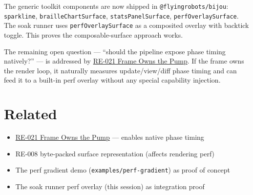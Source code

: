 The generic toolkit components are now shipped in \texttt{@\allowbreak{}f\allowbreak{}l\allowbreak{}y\allowbreak{}i\allowbreak{}n\allowbreak{}g\allowbreak{}r\allowbreak{}o\allowbreak{}b\allowbreak{}o\allowbreak{}t\allowbreak{}s\allowbreak{}/\allowbreak{}b\allowbreak{}i\allowbreak{}j\allowbreak{}o\allowbreak{}u}: \texttt{s\allowbreak{}p\allowbreak{}a\allowbreak{}r\allowbreak{}k\allowbreak{}l\allowbreak{}i\allowbreak{}n\allowbreak{}e}, \texttt{b\allowbreak{}r\allowbreak{}a\allowbreak{}i\allowbreak{}l\allowbreak{}l\allowbreak{}e\allowbreak{}C\allowbreak{}h\allowbreak{}a\allowbreak{}r\allowbreak{}t\allowbreak{}S\allowbreak{}u\allowbreak{}r\allowbreak{}f\allowbreak{}a\allowbreak{}c\allowbreak{}e}, \texttt{s\allowbreak{}t\allowbreak{}a\allowbreak{}t\allowbreak{}s\allowbreak{}P\allowbreak{}a\allowbreak{}n\allowbreak{}e\allowbreak{}l\allowbreak{}S\allowbreak{}u\allowbreak{}r\allowbreak{}f\allowbreak{}a\allowbreak{}c\allowbreak{}e}, \texttt{p\allowbreak{}e\allowbreak{}r\allowbreak{}f\allowbreak{}O\allowbreak{}v\allowbreak{}e\allowbreak{}r\allowbreak{}l\allowbreak{}a\allowbreak{}y\allowbreak{}S\allowbreak{}u\allowbreak{}r\allowbreak{}f\allowbreak{}a\allowbreak{}c\allowbreak{}e}. The soak runner uses \texttt{p\allowbreak{}e\allowbreak{}r\allowbreak{}f\allowbreak{}O\allowbreak{}v\allowbreak{}e\allowbreak{}r\allowbreak{}l\allowbreak{}a\allowbreak{}y\allowbreak{}S\allowbreak{}u\allowbreak{}r\allowbreak{}f\allowbreak{}a\allowbreak{}c\allowbreak{}e} as a composited overlay with backtick toggle. This proves the composable-surface approach works.

The remaining open question --- ``should the pipeline expose phase timing natively?'' --- is addressed by \href{https://github.com/flyingrobots/bijou/blob/cbd70612140e7a450d764b3c7be1c6af878b99bc/docs/method/retro/RE-021-frame-owns-the-pump.md}{RE-021 Frame Owns the Pump}. If the frame owns the render loop, it naturally measures update/view/diff phase timing and can feed it to a built-in perf overlay without any special capability injection.

\section{Related}\label{record-338-related}

\begin{itemize}
\tightlist
\item
  \href{https://github.com/flyingrobots/bijou/blob/cbd70612140e7a450d764b3c7be1c6af878b99bc/docs/method/retro/RE-021-frame-owns-the-pump.md}{RE-021 Frame Owns the Pump} --- enables native phase timing
\item
  RE-008 byte-packed surface representation (affects rendering perf)
\item
  The perf gradient demo (\texttt{e\allowbreak{}x\allowbreak{}a\allowbreak{}m\allowbreak{}p\allowbreak{}l\allowbreak{}e\allowbreak{}s\allowbreak{}/\allowbreak{}p\allowbreak{}e\allowbreak{}r\allowbreak{}f\allowbreak{}-\allowbreak{}g\allowbreak{}r\allowbreak{}a\allowbreak{}d\allowbreak{}i\allowbreak{}e\allowbreak{}n\allowbreak{}t}) as proof of concept
\item
  The soak runner perf overlay (this session) as integration proof
\end{itemize}

